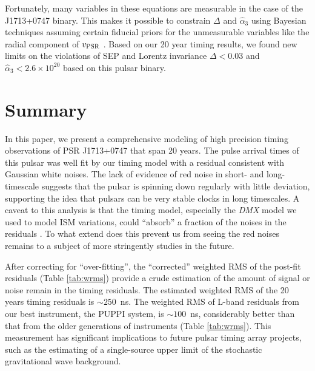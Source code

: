 Fortunately, many variables in these equations are measurable in the
case of the J1713+0747 binary. This makes it possible to constrain $\Delta$
and $\hat{\alpha}_3$ using Bayesian techniques assuming certain fiducial
priors for the unmeasurable variables like the radial component of
$v_{\rm PSR}$ \citep{sns+05, sfl+05, gsf+11}. Based on our 20 year 
timing results, we found new
limits on the violations of SEP and Lorentz invariance $\Delta < 0.03$ and
$\hat{\alpha}_3<2.6\times10^{20}$ based on this pulsar binary.


\section{Summary}
In this paper, we present a comprehensive modeling of high precision timing observations of
PSR J1713+0747 that span 20 years. 
The pulse arrival times of this pulsar was well fit by our timing model with a
residual consistent with Gaussian white noises.
The lack of evidence of red noise in short- and long-timescale suggests that
the pulsar is spinning down regularly with little deviation, supporting the
idea that pulsars can be very stable clocks in long timescales.
A caveat to this analysis is that the timing model, especially the
\textit{DMX} model we used to model ISM variations, could ``absorb'' a fraction
of the noises in the residuals \citep{kcs+13}. To what extend does this prevent us from
seeing the red noises remains to a subject of more stringently studies in the
future.

After correcting for ``over-fitting'', the ``corrected'' weighted RMS of the post-fit residuals (Table \ref{tab:wrms}) provide a crude estimation of
the amount of signal or noise remain in the timing residuals. The estimated
weighted RMS of the 20 years timing residuals is $\sim 250$~ns. The weighted
RMS of L-band residuals from our best instrument, the PUPPI system, is
$\sim100$~ns, considerably better than that from the older generations of
instruments (Table \ref{tab:wrms}).
This measurement has significant implications to future pulsar timing array
projects, such as the estimating of a single-source
upper limit of the stochastic gravitational wave background.


